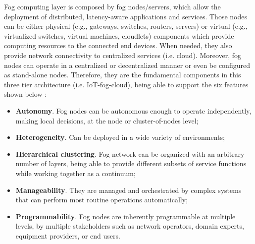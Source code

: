 Fog computing layer is composed by fog nodes/servers, which allow the deployment of distributed, latency-aware applications and services. Those nodes can be either physical (e.g., gateways, switches, routers, servers) or virtual (e.g., virtualized switches, virtual machines, cloudlets) components which provide computing resources to the connected end devices. When needed, they also provide network connectivity to centralized services (i.e. cloud). Moreover, fog nodes can operate in a centralized or decentralized manner or even be configured as stand-alone nodes. Therefore, they are the fundamental components in this three tier architecture (i.e. IoT-fog-cloud), being able to support the six features shown below \cite{iorga2018fog}:
\begin{itemize}
	\item \textbf{Autonomy}. Fog nodes can be autonomous enough to operate independently, making local decisions, at the node or cluster-of-nodes level;
	\item \textbf{Heterogeneity}. Can be deployed in a wide variety of environments;
	\item \textbf{Hierarchical clustering}. Fog network can be organized with an arbitrary number of layers, being able to provide different subsets of service functions while working together as a continuum;
	\item \textbf{Manageability}. They are managed and orchestrated by complex systems that can perform most routine operations automatically;
	\item \textbf{Programmability}. Fog nodes are inherently programmable at multiple levels, by multiple stakeholders such as network operators, domain experts, equipment providers, or end users.
\end{itemize}

